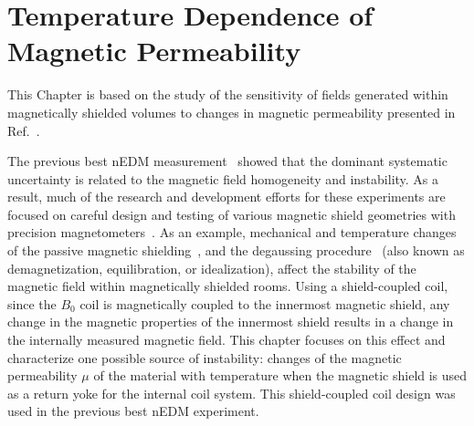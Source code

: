 \chapter{Temperature Dependence of Magnetic Permeability\label{chap:muofT}}
This Chapter is based on the study of the sensitivity of fields
generated within magnetically shielded volumes to changes in magnetic
permeability presented in Ref.~\cite{Andalib:2016ahj}.

The previous best nEDM measurement~\cite{Pendlebury2015} showed that
the dominant systematic uncertainty is related to the magnetic field
homogeneity and instability. As a result, much of the research and
development efforts for these experiments are focused on careful
design and testing of various magnetic shield geometries with
precision magnetometers~\cite{altarev2014magnetically,
  brys2005magnetic,afach2014dynamic,patton2014all}. As an example,
mechanical and temperature changes of the passive magnetic
shielding~\cite{voigt2013,thiel2007demagnetization}, and the
degaussing
procedure~\cite{thiel2007demagnetization,altarev2015minimizing,sun2016dynamic}
(also known as demagnetization, equilibration, or idealization),
affect the stability of the magnetic field within magnetically
shielded rooms. Using a shield-coupled coil, since the $B_0$ coil is
magnetically coupled to the innermost magnetic shield, any change in
the magnetic properties of the innermost shield results in a change in
the internally measured magnetic field. This chapter focuses on this
effect and characterize one possible source of instability: changes of
the magnetic permeability $\mu$ of the material with temperature when
the magnetic shield is used as a return yoke for the internal coil
system. This shield-coupled coil design was used in the previous best
nEDM experiment.




